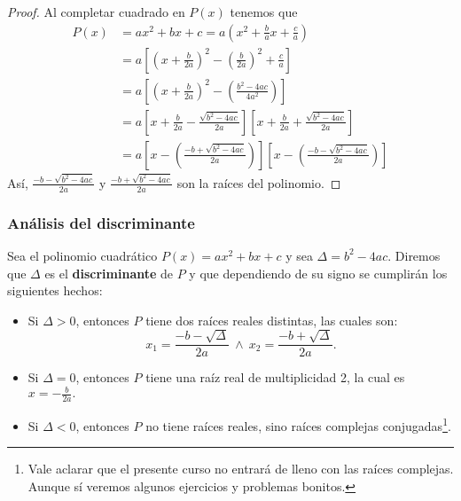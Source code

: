 \begin{proof}
    Al completar cuadrado en $P(x)$ tenemos que
    \begin{align*}
        P(x) &= ax^2 + bx + c = a \left( x^2 + \frac{b}{a}x + \frac{c}{a} \right) \\
        &= a \left[ \left( x + \frac{b}{2a} \right)^2 - \left( \frac{b}{2a} \right)^2 + \frac{c}{a} \right]\\
        &= a \left[ \left( x + \frac{b}{2a} \right)^2 - \left( \frac{b^2 - 4ac}{4a^2}\right) \right] \\
        &= a \left[ x + \frac{b}{2a} - \frac{\sqrt {b^2 - 4ac}}{2a}\right]\left[ x + \frac{b}{2a} + \frac{\sqrt {b^2 - 4ac}}{2a}\right] \\
        &= a \left[ x - \left( \frac{-b + \sqrt {b^2 - 4ac}}{2a} \right) \right]\left[ x - \left( \frac{-b - \sqrt {b^2 - 4ac}}{2a} \right) \right]
    \end{align*}
    Así, $\frac{-b - \sqrt {b^2 - 4ac}}{2a}$ y $\frac{-b + \sqrt {b^2 - 4ac}}{2a}$ son la raíces del polinomio.
\end{proof}


\subsubsection{Análisis del discriminante}

Sea el polinomio cuadrático $P(x) = ax^2 + bx + c$ y sea $\Delta = b^2 - 4ac$.
Diremos que $\Delta$ es el \textbf{discriminante} de $P$ y que dependiendo de su signo se cumplirán los siguientes hechos:
    \begin{itemize}
        \item Si $\Delta > 0$, entonces $P$ tiene dos raíces reales distintas, las cuales son:
        \[x_1 = \frac{-b - \sqrt{\Delta}}{2a} \ \land \ x_2 = \frac{-b + \sqrt {\Delta}}{2a}.\]
        \item Si $\Delta = 0$, entonces $P$ tiene una raíz real de multiplicidad 2, la cual es $x = -\frac{b}{2a}.$
        \item Si $\Delta < 0$, entonces $P$ no tiene raíces reales, sino raíces complejas conjugadas\footnote{Vale aclarar que el presente curso no entrará de lleno con las raíces complejas.\\Aunque sí veremos algunos ejercicios y problemas bonitos.}.
    \end{itemize}

